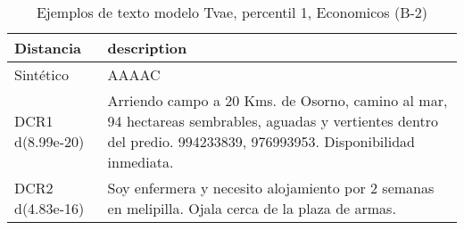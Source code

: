 \begin{table}[H]
\centering
\fontsize{10}{14}\selectfont
\caption{Ejemplos de texto modelo Tvae, percentil 1, Economicos (B-2)}
\label{table-example-economicos-b-2-tvae-1p-text}
\begin{tabular}{|l|m{35em}|}
\hline
\rowcolor[gray]{0.8}
Distancia & description \\
\hline Sintético & AAAAC \\
\hline DCR1 d(8.99e-20) & Arriendo campo a 20 Kms. de Osorno, camino al mar, 94 hectareas sembrables, aguadas y vertientes dentro del predio. 994233839, 976993953. Disponibilidad inmediata. \\
\hline DCR2 d(4.83e-16) & Soy enfermera y necesito alojamiento por 2 semanas en melipilla. Ojala cerca de la plaza de armas. \\
\hline
\end{tabular}
\end{table}
